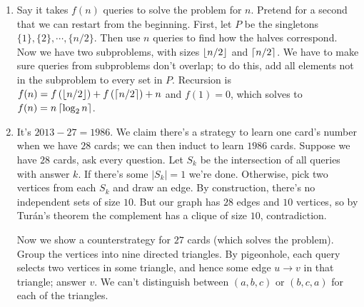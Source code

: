 \documentclass[11pt,paper=letter]{scrartcl}
\begin{document}
\begin{enumerate}
\item Say it takes $f(n)$ queries to solve the problem for $n$. Pretend for a second that we can restart from the beginning. First, let $P$ be the singletons $\{1\}, \{2\}, \cdots, \{n/2\}$. Then use $n$ queries to find how the halves correspond. Now we have two subproblems, with sizes $\left\lfloor n/2 \right\rfloor$ and $\left\lceil n/2 \right\rceil$. We have to make sure queries from subproblems don't overlap; to do this, add all elements not in the subproblem to every set in $P$. Recursion is $f(n) = f\left(\left\lfloor n/2 \right\rfloor\right) + f\left(\left\lceil n/2 \right\rceil\right) + n$ and $f(1) = 0$, which solves to $f(n) = n\left\lceil \log_2 n \right\rceil$.

\item It's $2013 - 27 = 1986$. We claim there's a strategy to learn one card's number when we have $28$ cards; we can then induct to learn $1986$ cards. Suppose we have $28$ cards, ask every question. Let $S_k$ be the intersection of all queries with answer $k$. If there's some $|S_k| = 1$ we're done. Otherwise, pick two vertices from each $S_k$ and draw an edge. By construction, there's no independent sets of size $10$. But our graph has $28$ edges and $10$ vertices, so by Tur\'an's theorem the complement has a clique of size $10$, contradiction.

Now we show a counterstrategy for $27$ cards (which solves the problem). Group the vertices into nine directed triangles. By pigeonhole, each query selects two vertices in some triangle, and hence some edge $u \to v$ in that triangle; answer $v$. We can't distinguish between $(a, b, c)$ or $(b, c, a)$ for each of the triangles.

\end{enumerate}
\end{document}
